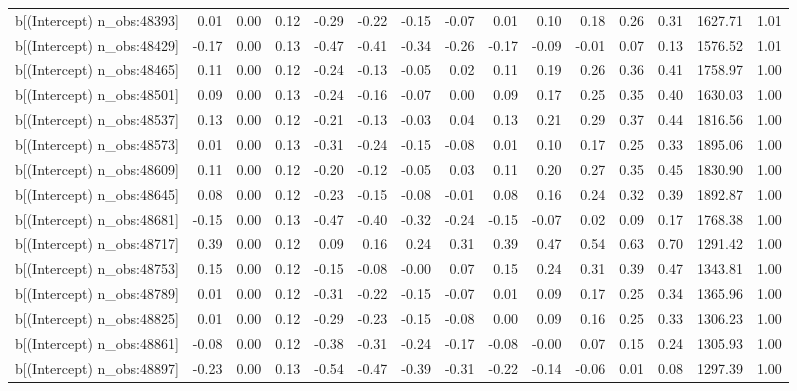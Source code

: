 \begin{table}[ht]
\begin{tabular}{rrrrrrrrrrrrrrr}
  b[(Intercept) n\_obs:48393] & 0.01 & 0.00 & 0.12 & -0.29 & -0.22 & -0.15 & -0.07 & 0.01 & 0.10 & 0.18 & 0.26 & 0.31 & 1627.71 & 1.01 \\ 
  b[(Intercept) n\_obs:48429] & -0.17 & 0.00 & 0.13 & -0.47 & -0.41 & -0.34 & -0.26 & -0.17 & -0.09 & -0.01 & 0.07 & 0.13 & 1576.52 & 1.01 \\ 
  b[(Intercept) n\_obs:48465] & 0.11 & 0.00 & 0.12 & -0.24 & -0.13 & -0.05 & 0.02 & 0.11 & 0.19 & 0.26 & 0.36 & 0.41 & 1758.97 & 1.00 \\ 
  b[(Intercept) n\_obs:48501] & 0.09 & 0.00 & 0.13 & -0.24 & -0.16 & -0.07 & 0.00 & 0.09 & 0.17 & 0.25 & 0.35 & 0.40 & 1630.03 & 1.00 \\ 
  b[(Intercept) n\_obs:48537] & 0.13 & 0.00 & 0.12 & -0.21 & -0.13 & -0.03 & 0.04 & 0.13 & 0.21 & 0.29 & 0.37 & 0.44 & 1816.56 & 1.00 \\ 
  b[(Intercept) n\_obs:48573] & 0.01 & 0.00 & 0.13 & -0.31 & -0.24 & -0.15 & -0.08 & 0.01 & 0.10 & 0.17 & 0.25 & 0.33 & 1895.06 & 1.00 \\ 
  b[(Intercept) n\_obs:48609] & 0.11 & 0.00 & 0.12 & -0.20 & -0.12 & -0.05 & 0.03 & 0.11 & 0.20 & 0.27 & 0.35 & 0.45 & 1830.90 & 1.00 \\ 
  b[(Intercept) n\_obs:48645] & 0.08 & 0.00 & 0.12 & -0.23 & -0.15 & -0.08 & -0.01 & 0.08 & 0.16 & 0.24 & 0.32 & 0.39 & 1892.87 & 1.00 \\ 
  b[(Intercept) n\_obs:48681] & -0.15 & 0.00 & 0.13 & -0.47 & -0.40 & -0.32 & -0.24 & -0.15 & -0.07 & 0.02 & 0.09 & 0.17 & 1768.38 & 1.00 \\ 
  b[(Intercept) n\_obs:48717] & 0.39 & 0.00 & 0.12 & 0.09 & 0.16 & 0.24 & 0.31 & 0.39 & 0.47 & 0.54 & 0.63 & 0.70 & 1291.42 & 1.00 \\ 
  b[(Intercept) n\_obs:48753] & 0.15 & 0.00 & 0.12 & -0.15 & -0.08 & -0.00 & 0.07 & 0.15 & 0.24 & 0.31 & 0.39 & 0.47 & 1343.81 & 1.00 \\ 
  b[(Intercept) n\_obs:48789] & 0.01 & 0.00 & 0.12 & -0.31 & -0.22 & -0.15 & -0.07 & 0.01 & 0.09 & 0.17 & 0.25 & 0.34 & 1365.96 & 1.00 \\ 
  b[(Intercept) n\_obs:48825] & 0.01 & 0.00 & 0.12 & -0.29 & -0.23 & -0.15 & -0.08 & 0.00 & 0.09 & 0.16 & 0.25 & 0.33 & 1306.23 & 1.00 \\ 
  b[(Intercept) n\_obs:48861] & -0.08 & 0.00 & 0.12 & -0.38 & -0.31 & -0.24 & -0.17 & -0.08 & -0.00 & 0.07 & 0.15 & 0.24 & 1305.93 & 1.00 \\ 
  b[(Intercept) n\_obs:48897] & -0.23 & 0.00 & 0.13 & -0.54 & -0.47 & -0.39 & -0.31 & -0.22 & -0.14 & -0.06 & 0.01 & 0.08 & 1297.39 & 1.00 \\ 

\end{tabular}
\end{table}
